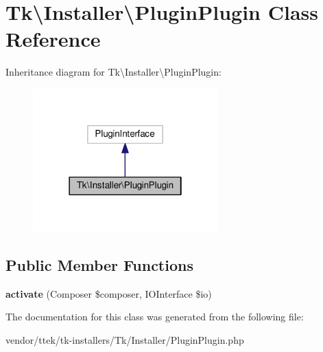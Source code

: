 \hypertarget{classTk_1_1Installer_1_1PluginPlugin}{\section{Tk\textbackslash{}Installer\textbackslash{}Plugin\+Plugin Class Reference}
\label{classTk_1_1Installer_1_1PluginPlugin}
}


Inheritance diagram for Tk\textbackslash{}Installer\textbackslash{}Plugin\+Plugin\+:\nopagebreak
\begin{figure}[H]
\begin{center}
\leavevmode
\includegraphics[width=202pt]{classTk_1_1Installer_1_1PluginPlugin__inherit__graph}
\end{center}
\end{figure}
\subsection*{Public Member Functions}
\begin{DoxyCompactItemize}
\item 
\hypertarget{classTk_1_1Installer_1_1PluginPlugin_a13f71f5fc27c1a9bd6472129be6d0b65}{{\bfseries activate} (Composer \$composer, I\+O\+Interface \$io)}\label{classTk_1_1Installer_1_1PluginPlugin_a13f71f5fc27c1a9bd6472129be6d0b65}

\end{DoxyCompactItemize}


The documentation for this class was generated from the following file\+:\begin{DoxyCompactItemize}
\item 
vendor/ttek/tk-\/installers/\+Tk/\+Installer/Plugin\+Plugin.\+php\end{DoxyCompactItemize}
